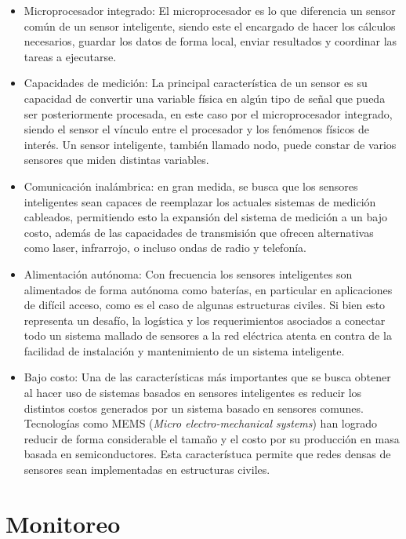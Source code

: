 \begin{itemize}
    \item Microprocesador integrado: El microprocesador es lo que diferencia un sensor común de un sensor inteligente, siendo este el encargado de hacer los cálculos necesarios, guardar los datos de forma local, enviar resultados y coordinar las tareas a ejecutarse. 
    
    \item Capacidades de medición: La principal característica de un sensor es su capacidad de convertir una variable física en algún tipo de señal que pueda ser posteriormente procesada, en este caso por el microprocesador integrado, siendo el sensor el vínculo entre el procesador y los fenómenos físicos de interés. Un sensor inteligente, también llamado nodo, puede constar de varios sensores que miden distintas variables.
    
    \item Comunicación inalámbrica: en gran medida, se busca que los sensores inteligentes sean capaces de reemplazar los actuales sistemas de medición cableados, permitiendo esto la expansión del sistema de medición a un bajo costo, además de las capacidades de transmisión que ofrecen alternativas como laser, infrarrojo, o incluso ondas de radio y telefonía.
    
    \item Alimentación autónoma: Con frecuencia los sensores inteligentes son alimentados de forma autónoma como baterías, en particular en aplicaciones de difícil acceso, como es el caso de algunas estructuras civiles. Si bien esto representa un desafío, la logística y los requerimientos asociados a conectar todo un sistema mallado de sensores a la red eléctrica atenta en contra de la facilidad de instalación y mantenimiento de un sistema inteligente.
    
    \item Bajo costo: Una de las características más importantes que se busca obtener al hacer uso de sistemas basados en sensores inteligentes es reducir los distintos costos generados por un sistema basado en sensores comunes. Tecnologías como MEMS (\textit{Micro electro-mechanical systems}) han logrado reducir de forma considerable el tamaño y el costo por su producción en masa basada en semiconductores. Esta característuca permite que redes densas de sensores sean implementadas en estructuras civiles.
\end{itemize}


\section{Monitoreo}

